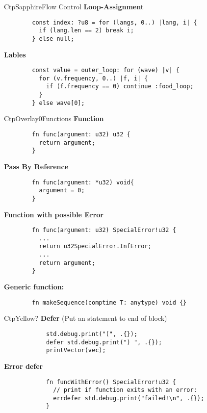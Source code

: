 \documentclass[10pt,a4paper]{article}
\begin{document}
\begin{multicols*}{3}
\begin{mycolorbox}{CtpSapphire}{Flow Control}
		\textbf{Loop-Assignment}
	\begin{verbatim}
		const index: ?u8 = for (langs, 0..) |lang, i| {
		  if (lang.len == 2) break i;
		} else null;
	\end{verbatim}

		\textbf{Lables}
	\begin{verbatim}
		const value = outer_loop: for (wave) |v| {
		  for (v.frequency, 0..) |f, i| {
		    if (f.frequency == 0) continue :food_loop;
		  }
		} else wave[0];
	\end{verbatim}
\end{mycolorbox}

\begin{mycolorbox}{CtpOverlay0}{Functions}
		\textbf{Function}
	\begin{verbatim}
		fn func(argument: u32) u32 {
		  return argument;
		}
	\end{verbatim}

		\textbf{Pass By Reference}
	\begin{verbatim}
		fn func(argument: *u32) void{
		  argument = 0;
		}
	\end{verbatim}

		\textbf{Function with possible Error}
	\begin{verbatim}
		fn func(argument: u32) SpecialError!u32 {
		  ... 
		  return u32SpecialError.InfError;
		  ...	
		  return argument;
		}
	\end{verbatim}

		\textbf{Generic function:}
	\begin{verbatim}
		fn makeSequence(comptime T: anytype) void {}
	\end{verbatim}
\end{mycolorbox}


\begin{mycolorbox}{CtpYellow}{?}
			\textbf{Defer} (Put an statement to end of block)
		\begin{verbatim}
			std.debug.print("(", .{});
			defer std.debug.print(") ", .{}); 
			printVector(vec);
		\end{verbatim}
	
				\textbf{Error defer}
		\begin{verbatim}
			fn funcWithError() SpecialError!u32 {
			  // print if function exits with an error:
			  errdefer std.debug.print("failed!\n", .{});
			}
		\end{verbatim}
	

\end{mycolorbox}
\end{multicols*}
\end{document}
